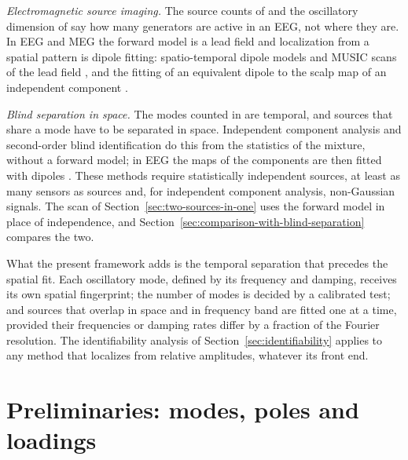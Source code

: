 \documentclass{article}
\begin{document}
\emph{Electromagnetic source imaging.} The source counts of \cite{ref-BernadotteBuchstaber, ref-Bernadotte05} and the oscillatory dimension of \cite{ref-Bernadotte07} say how many generators are active in an EEG, not where they are. In EEG and MEG the forward model is a lead field and localization from a spatial pattern is dipole fitting: spatio-temporal dipole models and MUSIC scans of the lead field \cite{ref-Mosher01}, and the fitting of an equivalent dipole to the scalp map of an independent component \cite{ref-Delorme}.

\emph{Blind separation in space.} The modes counted in \cite{ref-BernadotteBuchstaber, ref-Bernadotte05} are temporal, and sources that share a mode have to be separated in space. Independent component analysis \cite{ref-Comon, ref-Hyvarinen} and second-order blind identification \cite{ref-Belouchrani} do this from the statistics of the mixture, without a forward model; in EEG the maps of the components are then fitted with dipoles \cite{ref-Delorme}. These methods require statistically independent sources, at least as many sensors as sources and, for independent component analysis, non-Gaussian signals. The scan of Section~\ref{sec:two-sources-in-one} uses the forward model in place of independence, and Section~\ref{sec:comparison-with-blind-separation} compares the two.

What the present framework adds is the temporal separation that precedes the spatial fit. Each oscillatory mode, defined by its frequency and damping, receives its own spatial fingerprint; the number of modes is decided by a calibrated test; and sources that overlap in space and in frequency band are fitted one at a time, provided their frequencies or damping rates differ by a fraction of the Fourier resolution. The identifiability analysis of Section~\ref{sec:identifiability} applies to any method that localizes from relative amplitudes, whatever its front end.


\section{Preliminaries: modes, poles and loadings}\label{sec:preliminaries}
\end{document}
